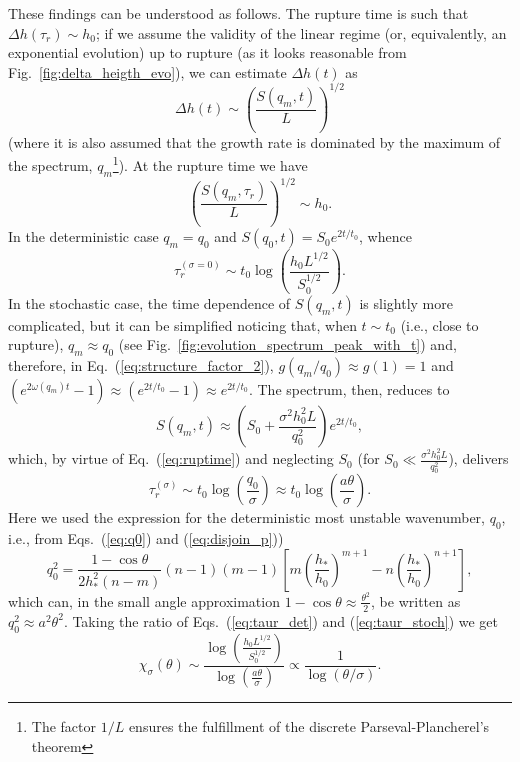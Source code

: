 These findings can be understood as follows. 
The rupture time is such that $\Delta h(\tau_r) \sim h_0$; if we assume the validity of the linear regime (or, equivalently, an exponential evolution) up to rupture (as it looks reasonable from Fig.~\ref{fig:delta_heigth_evo}), we can estimate $\Delta h(t)$ as 
$$
  \Delta h(t) \sim \left(\frac{S(q_m,t)}{L}\right)^{1/2}
$$
(where it is also assumed that the growth rate is dominated by the maximum of the spectrum, $q_m$\footnote{The factor $1/L$ ensures the fulfillment of the discrete Parseval-Plancherel's theorem}).
At the rupture time we have
\begin{equation}\label{eq:ruptime}
  \left(\frac{S(q_m,\tau_r)}{L}\right)^{1/2} \sim h_0.
\end{equation}
In the deterministic case $q_m=q_0$ and $S(q_0,t) = S_0e^{2t/t_0}$, 
whence
\begin{equation}\label{eq:taur_det}
    \tau_r^{(\sigma=0)} \sim t_0 \log\left(\frac{h_0 L^{1/2}}{S_0^{1/2}}\right).
\end{equation}
In the stochastic case, the time dependence of $S(q_m,t)$ is slightly more complicated, but it can be simplified noticing that, when $t \sim t_0$ (i.e., close to rupture), $q_m \approx q_0$ (see Fig.~\ref{fig:evolution_spectrum_peak_with_t}) and, therefore, in Eq.~(\ref{eq:structure_factor_2}), $g(q_m/q_0) \approx g(1) = 1$ and $(e^{2\omega(q_m)t}-1) \approx (e^{2t/t_0}-1) \approx e^{2t/t_0}$.
The spectrum, then, reduces to 
$$
  S(q_m,t) \approx \left(S_0 + \frac{\sigma^2 h_0^2 L}{q_0^2}\right)e^{2t/t_0},
$$
which, by virtue of Eq.~(\ref{eq:ruptime}) and neglecting $S_0$ (for $S_0 \ll \frac{\sigma^2 h_0^2 L}{q_0^2}$), delivers
\begin{equation}\label{eq:taur_stoch}
    \tau_r^{(\sigma)} \sim t_0 \log\left(\frac{q_0}{\sigma}\right) \approx t_0 \log \left( \frac{a \theta}{\sigma}\right).
\end{equation}
Here we used the expression for the deterministic most unstable wavenumber, $q_0$, i.e., from Eqs.~(\ref{eq:q0}) and (\ref{eq:disjoin_p})) 
$$
  q_0^2=\frac{1-\cos \theta}{2h_{\ast}^2(n-m)}(n-1)(m-1)\left[m\left(\frac{h_{\ast}}{h_0}\right)^{m+1} - n\left(\frac{h_{\ast}}{h_0}\right)^{n+1}\right],
$$ 
which can, in the small angle approximation $1-\cos \theta \approx \frac{\theta^2}{2}$, be written as $q_0^2 \approx a^2 \theta^2$.
Taking the ratio of Eqs.~(\ref{eq:taur_det}) and (\ref{eq:taur_stoch}) we get
\begin{equation}\label{eq:chi}
    \chi_{\sigma}(\theta) \sim \frac{\log\left(\frac{h_0 L^{1/2}}{S_0^{1/2}}\right)}{\log\left(\frac{a \theta}{\sigma}\right)} \propto \frac{1}{\log(\theta/\sigma)}.
\end{equation}
